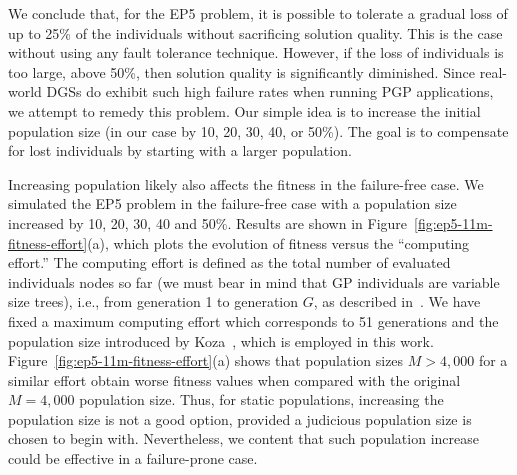\documentclass[graybox]{sty/svmult}
\begin{document}
We conclude that, for the EP5 problem, it is possible to tolerate
a gradual loss of up to 25\% of the individuals without sacrificing
solution quality. This is the case without using any fault tolerance
technique.  However, if the loss of individuals is too
large, above 50\%, then solution quality is significantly diminished.
Since real-world DGSs do exhibit such high failure rates when
running PGP applications, we attempt to remedy this problem. Our simple
idea is to increase the initial population size (in our case by 10,
20, 30, 40, or 50\%). The goal is to compensate for lost individuals by
starting with a larger population.

Increasing population likely also affects the fitness in the failure-free
case.  We simulated the EP5 problem in the failure-free case with a
population size increased by 10, 20, 30, 40 and 50\%. Results are shown
in Figure~\ref{fig:ep5-11m-fitness-effort}(a), which plots the evolution
of fitness versus the ``computing effort.'' The computing effort is
defined as the total number of evaluated individuals nodes so far (we must bear in mind that GP individuals are variable size
trees), i.e., from
generation 1 to generation $G$, as described in~\cite{plague}.  We have
fixed a maximum computing effort which corresponds to 51 generations
and the population size introduced by Koza~\cite{koza:book}, which is
employed in this work. Figure~\ref{fig:ep5-11m-fitness-effort}(a) shows
that population sizes $M>4,000$ for a similar effort obtain worse
fitness values when compared with the original $M=4,000$ population size. Thus, for static populations,
increasing the population size is not a good option, provided a judicious
population size is chosen to begin with. Nevertheless, we content that
such population increase could be effective in a failure-prone case.
\end{document}
